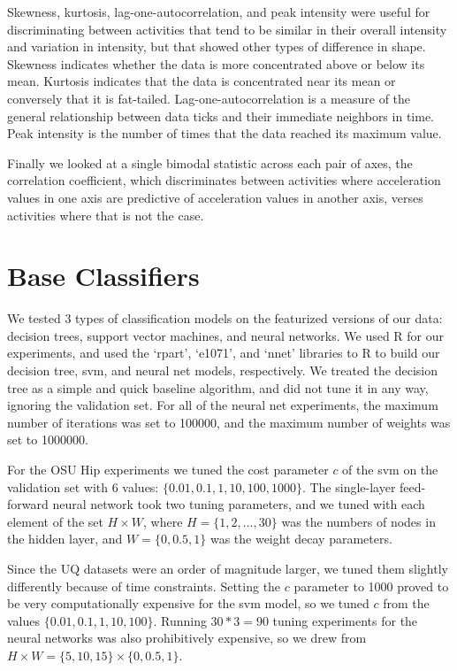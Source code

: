 Skewness, kurtosis, lag-one-autocorrelation, and peak intensity
were useful for discriminating between
activities that tend to be similar in their overall intensity and variation in intensity,
but that showed other types of difference in shape. Skewness indicates whether the data is
more concentrated above or below its mean. Kurtosis indicates that the data is concentrated
near its mean or conversely that it is fat-tailed. Lag-one-autocorrelation is a measure of
the general relationship between data ticks and their immediate neighbors in time. Peak
intensity is the number of times that the data reached its maximum value. 

Finally we looked at a single bimodal statistic across each pair of axes, the correlation
coefficient, which discriminates between activities where acceleration values in one axis
are predictive of acceleration values in another axis, verses activities where that is not the case.

\section{Base Classifiers}

We tested 3 types of classification models on the featurized versions of our data:
decision trees, support vector machines, and neural networks. We used R for our
experiments, and used the `rpart', `e1071', and `nnet' libraries to R to build
our decision tree, svm, and neural net models, respectively. We treated the
decision tree as a simple and quick baseline algorithm, and did not tune it in
any way, ignoring the validation set. For all of the neural net experiments,
the maximum number of iterations was set to 100000, and the maximum number of
weights was set to 1000000.

For the OSU Hip experiments we tuned the
cost parameter $c$ of the svm on the validation set with 6 values:
$\{0.01,0.1,1,10,100,1000\}$. The single-layer feed-forward neural network took
two tuning parameters, and we tuned with each element of the set $H \times W$,
where $H = \{1,2, \ldots, 30\}$ was the numbers of nodes in the hidden layer, and 
$W = \{0,0.5,1\}$ was the weight decay parameters.

Since the UQ datasets were an order of magnitude larger, we tuned them
slightly differently because of time constraints. Setting the $c$ parameter to
1000 proved to be very computationally expensive for the svm model, so we tuned $c$
from the values $\{0.01,0.1,1,10,100\}$. Running $30*3=90$ tuning experiments
for the neural networks was also prohibitively expensive, so we drew from
$H \times W = \{5,10,15\} \times \{0,0.5,1\}$.

